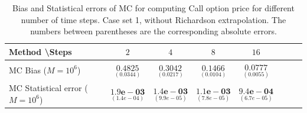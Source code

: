\documentclass[11pt]{article}
\begin{document}
\begin{table}[h!]
	\centering
	\begin{tabular}{l*{6}{c}r}
		Method \textbackslash  Steps            & $2$ & $4$ & $8$ & $16$  \\
		\hline
		MC Bias ($M=10^6$)   & 	$ \underset{( 0.0344)}{\mathbf{0.4825}}$  & $\underset{( 0.0217)}{\mathbf{0.3042}}$  & $\underset{(0.0104)}{\mathbf{0.1466}}$ & $\underset{( 0.0055)}{\mathbf{0.0777}}$\\ 
		
		MC Statistical error ($M=10^6$)  &  $\underset{(  1.4e-04)} {\mathbf{1.9e-03}}$  & $\underset{(9.9e-05)} {\mathbf{1.4e-03}}$  & $\underset{(7.8e-05)} {\mathbf{ 1.1e-03}}$ & $\underset{( 6.7e-05)} {\mathbf{9.4e-04}}$	\\
		
		\hline
	\end{tabular}
	\caption{Bias and Statistical errors of MC  for computing Call option price  for different number of time steps. Case set 1, without Richardson extrapolation. The numbers between parentheses are the corresponding absolute errors.}
	\label{Bias and Statistical errors of MC ($M=10^6$)  for computing Call option price  for different number of time steps. Case set 1, without Richardson extrapolation. The numbers between parentheses are the corresponding absolute errors.}
\end{table}
\end{document}
